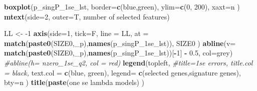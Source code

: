\documentclass[
]{book}
\newenvironment{Shaded}{\begin{snugshade}}{\end{snugshade}}
\newcommand{\CommentTok}[1]{\textcolor[rgb]{0.56,0.35,0.01}{\textit{#1}}}
\newcommand{\DataTypeTok}[1]{\textcolor[rgb]{0.13,0.29,0.53}{#1}}
\newcommand{\DecValTok}[1]{\textcolor[rgb]{0.00,0.00,0.81}{#1}}
\newcommand{\FloatTok}[1]{\textcolor[rgb]{0.00,0.00,0.81}{#1}}
\newcommand{\KeywordTok}[1]{\textcolor[rgb]{0.13,0.29,0.53}{\textbf{#1}}}
\newcommand{\NormalTok}[1]{#1}
\newcommand{\OperatorTok}[1]{\textcolor[rgb]{0.81,0.36,0.00}{\textbf{#1}}}
\newcommand{\StringTok}[1]{\textcolor[rgb]{0.31,0.60,0.02}{#1}}
\begin{document}
\begin{Shaded}
\begin{Highlighting}[]
\KeywordTok{boxplot}\NormalTok{(p\_singP\_1se\_lst,}
  \DataTypeTok{border=}\KeywordTok{c}\NormalTok{(}\StringTok{\textquotesingle{}blue\textquotesingle{}}\NormalTok{,}\StringTok{\textquotesingle{}green\textquotesingle{}}\NormalTok{),}
  \DataTypeTok{ylim=}\KeywordTok{c}\NormalTok{(}\DecValTok{0}\NormalTok{, }\DecValTok{200}\NormalTok{),}
  \DataTypeTok{xaxt=}\StringTok{\textquotesingle{}n\textquotesingle{}}
\NormalTok{)}
\KeywordTok{mtext}\NormalTok{(}\DataTypeTok{side=}\DecValTok{2}\NormalTok{, }\DataTypeTok{outer=}\NormalTok{T,  }\StringTok{\textquotesingle{}number of selected features\textquotesingle{}}\NormalTok{)}

\NormalTok{LL <{-}}\StringTok{ }\DecValTok{{-}1}
\KeywordTok{axis}\NormalTok{(}\DataTypeTok{side=}\DecValTok{1}\NormalTok{, }\DataTypeTok{tick=}\NormalTok{F, }\DataTypeTok{line =}\NormalTok{ LL,}
  \DataTypeTok{at =} \KeywordTok{match}\NormalTok{(}\KeywordTok{paste0}\NormalTok{(SIZE0,}\StringTok{\textquotesingle{}\_p\textquotesingle{}}\NormalTok{),}\KeywordTok{names}\NormalTok{(p\_singP\_1se\_lst)),}
\NormalTok{  SIZE0}
\NormalTok{ )}
\KeywordTok{abline}\NormalTok{(}\DataTypeTok{v=} \KeywordTok{match}\NormalTok{(}\KeywordTok{paste0}\NormalTok{(SIZE0,}\StringTok{\textquotesingle{}\_p\textquotesingle{}}\NormalTok{),}\KeywordTok{names}\NormalTok{(p\_singP\_1se\_lst))[}\OperatorTok{{-}}\DecValTok{1}\NormalTok{] }\OperatorTok{{-}}\StringTok{ }\FloatTok{0.5}\NormalTok{, }\DataTypeTok{col=}\StringTok{\textquotesingle{}grey\textquotesingle{}}\NormalTok{)}
\CommentTok{\#abline(h= nzero\_1se\_q2, col = \textquotesingle{}red\textquotesingle{})}
\KeywordTok{legend}\NormalTok{(}\StringTok{\textquotesingle{}topleft\textquotesingle{}}\NormalTok{,}
   \CommentTok{\#title=\textquotesingle{}1se errors\textquotesingle{}, title.col = \textquotesingle{}black\textquotesingle{},}
   \DataTypeTok{text.col =} \KeywordTok{c}\NormalTok{(}\StringTok{\textquotesingle{}blue\textquotesingle{}}\NormalTok{, }\StringTok{\textquotesingle{}green\textquotesingle{}}\NormalTok{),}
   \DataTypeTok{legend=} \KeywordTok{c}\NormalTok{(}\StringTok{\textquotesingle{}selected genes\textquotesingle{}}\NormalTok{,}\StringTok{\textquotesingle{}signature genes\textquotesingle{}}\NormalTok{),}
   \DataTypeTok{bty=}\StringTok{\textquotesingle{}n\textquotesingle{}}
\NormalTok{ )}
\KeywordTok{title}\NormalTok{(}\KeywordTok{paste}\NormalTok{(}\StringTok{\textquotesingle{}one se lambda models\textquotesingle{}}\NormalTok{) )}


\end{Highlighting}
\end{Shaded}
\end{document}
